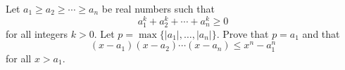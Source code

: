 Let $a_1 \geq a_2 \geq \cdots \geq a_n$ be real numbers such that
\[
a_1^k + a_2^k + \cdots + a_n^k \geq 0
\]
for all integers $k > 0$. Let $p = \max\{|a_1|, \ldots, |a_n|\}$. Prove that $p = a_1$ and that
\[
(x - a_1)(x - a_2) \cdots (x - a_n) \leq x^n - a_1^n
\]
for all $x > a_1$.
